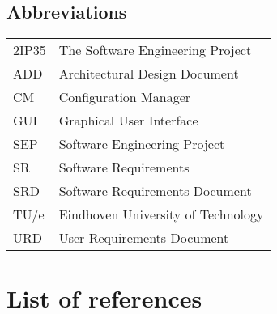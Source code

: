 \subsection{Abbreviations}
\begin{tabular}{l|l}
2IP35 & The Software Engineering Project \\
ADD & Architectural Design Document \\
CM    & Configuration Manager \\
GUI & Graphical User Interface \\
SEP   & Software Engineering Project \\
SR    & Software Requirements \\
SRD   & Software Requirements Document \\
TU/e  & Eindhoven University of Technology \\
URD   & User Requirements Document \\
\end{tabular}

\section{List of references}
